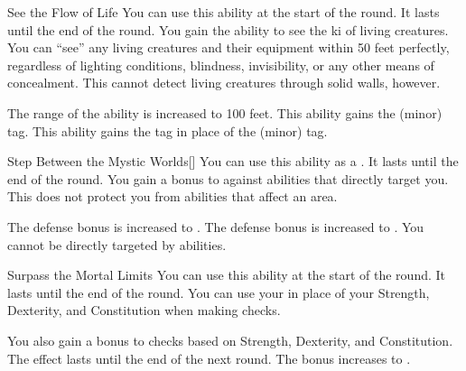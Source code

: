 {            \begin{apability}{See the Flow of Life}
                You can use this ability at the start of the round.
                It lasts until the end of the round.
                You gain the ability to see the ki of living creatures.
                You can ``see'' any living creatures and their equipment within 50 feet perfectly, regardless of lighting conditions, blindness, invisibility, or any other means of concealment.
                This cannot detect living creatures through solid walls, however.

                \rankline
                 The range of the ability is increased to 100 feet.
                 This ability gains the  (minor) tag.
                 This ability gains the  tag in place of the  (minor) tag.
            \end{apability}

            \begin{apability}{Step Between the Mystic Worlds}[]
                You can use this ability as a .
                It lasts until the end of the round.
                You gain a  bonus to  against  abilities that directly target you.
                This does not protect you from abilities that affect an area.

                \rankline
                 The defense bonus is increased to .
                 The defense bonus is increased to .
                 You cannot be directly targeted by  abilities.
            \end{apability}

            \begin{apability}{Surpass the Mortal Limits}
                You can use this ability at the start of the round.
                It lasts until the end of the round.
                You can use your  in place of your Strength, Dexterity, and Constitution when making checks.

                \rankline
                 You also gain a  bonus to checks based on Strength, Dexterity, and Constitution.
                 The effect lasts until the end of the next round.
                 The bonus increases to .
            \end{apability}

        }

